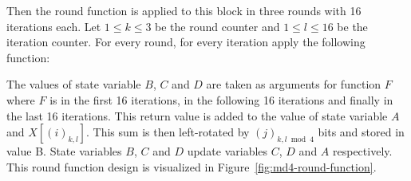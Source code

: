 \begin{description}
    Then the round function is applied to this block in three rounds
    with 16 iterations each. Let $1 \leq k \leq 3$ be the round counter
    and $1 \leq l \leq 16$ be the iteration counter. For every round,
    for every iteration apply the following function:

    The values of state variable $B$, $C$ and $D$ are taken as arguments
    for function $F$ where $F$ is  in the first 16 iterations,
     in the following 16 iterations and finally 
    in the last 16 iterations. This return value is added to the value of state
    variable $A$ and $X[(i)_{k,l}]$. This sum is then left-rotated by
    $(j)_{k,l \bmod{4}}$ bits and stored in value B. State variables $B$, $C$ and
    $D$ update variables $C$, $D$ and $A$ respectively.
%
    This round function design is visualized in Figure~\ref{fig:md4-round-function}.
\end{description}

